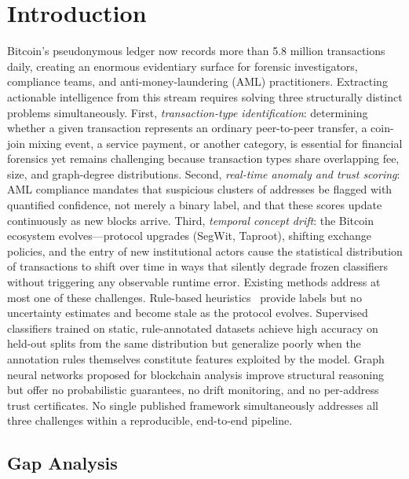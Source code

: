 \documentclass[journal]{IEEEtran}
\begin{document}
\section{Introduction}
\label{sec:introduction}

Bitcoin's pseudonymous ledger now records more than \num{5.8} million
transactions daily, creating an enormous evidentiary surface for forensic
investigators, compliance teams, and anti-money-laundering (AML) practitioners.
Extracting actionable intelligence from this stream requires solving three
structurally distinct problems simultaneously.
First, \emph{transaction-type identification}: determining whether a given
transaction represents an ordinary peer-to-peer transfer, a coin-join mixing
event, a service payment, or another category, is essential for financial
forensics yet remains challenging because transaction types share overlapping
fee, size, and graph-degree distributions.
Second, \emph{real-time anomaly and trust scoring}: AML compliance mandates
that suspicious clusters of addresses be flagged with quantified confidence,
not merely a binary label, and that these scores update continuously as new
blocks arrive.
Third, \emph{temporal concept drift}: the Bitcoin ecosystem evolves---protocol
upgrades (SegWit, Taproot), shifting exchange policies, and the entry of new
institutional actors cause the statistical distribution of transactions to
shift over time in ways that silently degrade frozen classifiers without
triggering any observable runtime error.
Existing methods address at most one of these challenges.
Rule-based heuristics~\cite{Harrigan2016} provide labels but no uncertainty
estimates and become stale as the protocol evolves.
Supervised classifiers trained on static, rule-annotated datasets achieve
high accuracy on held-out splits from the same distribution but generalize
poorly when the annotation rules themselves constitute features exploited by
the model.
Graph neural networks proposed for blockchain analysis
\cite{Pareja2020,Weber2019} improve structural reasoning but offer no
probabilistic guarantees, no drift monitoring, and no per-address trust
certificates.
No single published framework simultaneously addresses all three challenges
within a reproducible, end-to-end pipeline.

\subsection*{Gap Analysis}
\end{document}
